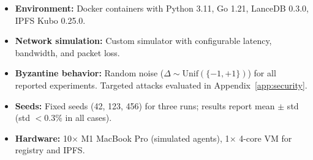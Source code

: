 \documentclass[11pt]{article}
\begin{document}
\begin{itemize}[leftmargin=1.5em]
    \item \textbf{Environment:} Docker containers with Python 3.11, Go 1.21,
          LanceDB 0.3.0, IPFS Kubo 0.25.0.
    \item \textbf{Network simulation:} Custom simulator with configurable
          latency, bandwidth, and packet loss.
    \item \textbf{Byzantine behavior:} Random noise ($\Delta \sim \text{Unif}(\{-1,+1\})$)
          for all reported experiments. Targeted attacks evaluated in
          Appendix~\ref{app:security}.
    \item \textbf{Seeds:} Fixed seeds (42, 123, 456) for three runs; results
          report mean $\pm$ std (std $< 0.3\%$ in all cases).
    \item \textbf{Hardware:} 10$\times$ M1 MacBook Pro (simulated agents),
          1$\times$ 4-core VM for registry and IPFS.
\end{itemize}
\end{document}
